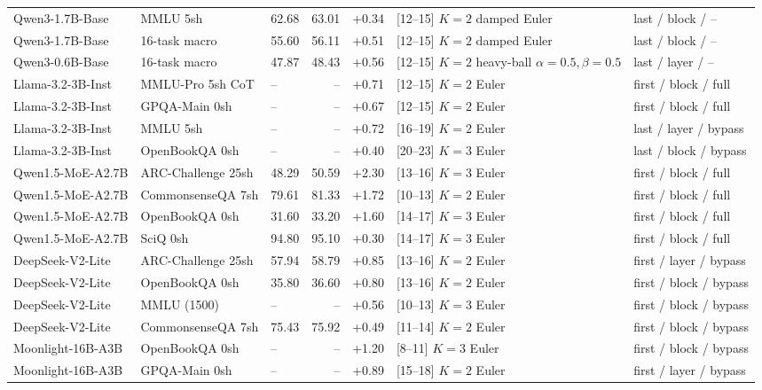 \begin{table}[h]
{\begin{tabular}{lllrrll}
Qwen3-1.7B-Base    & MMLU 5sh          & 62.68 & 63.01 & +0.34 & [12--15] $K{=}2$ damped Euler    & last  / block / -- \\
Qwen3-1.7B-Base    & 16-task macro     & 55.60 & 56.11 & +0.51 & [12--15] $K{=}2$ damped Euler    & last  / block / -- \\
Qwen3-0.6B-Base    & 16-task macro     & 47.87 & 48.43 & +0.56 & [12--15] $K{=}2$ heavy-ball $\alpha{=}0.5,\beta{=}0.5$ & last / layer / -- \\
\midrule
Llama-3.2-3B-Inst  & MMLU-Pro 5sh CoT  & --    & --    & +0.71 & [12--15] $K{=}2$ Euler  & first / block / full \\
Llama-3.2-3B-Inst  & GPQA-Main 0sh     & --    & --    & +0.67 & [12--15] $K{=}2$ Euler  & first / block / full \\
Llama-3.2-3B-Inst  & MMLU 5sh          & --    & --    & +0.72 & [16--19] $K{=}2$ Euler  & last  / layer / bypass \\
Llama-3.2-3B-Inst  & OpenBookQA 0sh    & --    & --    & +0.40 & [20--23] $K{=}3$ Euler  & last  / block / bypass \\
\midrule
Qwen1.5-MoE-A2.7B  & ARC-Challenge 25sh& 48.29 & 50.59 & +2.30 & [13--16] $K{=}3$ Euler  & first / block / full \\
Qwen1.5-MoE-A2.7B  & CommonsenseQA 7sh & 79.61 & 81.33 & +1.72 & [10--13] $K{=}2$ Euler  & first / block / full \\
Qwen1.5-MoE-A2.7B  & OpenBookQA 0sh    & 31.60 & 33.20 & +1.60 & [14--17] $K{=}3$ Euler  & first / block / full \\
Qwen1.5-MoE-A2.7B  & SciQ 0sh          & 94.80 & 95.10 & +0.30 & [14--17] $K{=}3$ Euler  & first / block / full \\
\midrule
DeepSeek-V2-Lite   & ARC-Challenge 25sh& 57.94 & 58.79 & +0.85 & [13--16] $K{=}2$ Euler  & first / layer / bypass \\
DeepSeek-V2-Lite   & OpenBookQA 0sh    & 35.80 & 36.60 & +0.80 & [13--16] $K{=}2$ Euler  & first / block / bypass \\
DeepSeek-V2-Lite   & MMLU (1500)       & --    & --    & +0.56 & [10--13] $K{=}3$ Euler  & first / block / bypass \\
DeepSeek-V2-Lite   & CommonsenseQA 7sh & 75.43 & 75.92 & +0.49 & [11--14] $K{=}2$ Euler  & first / block / bypass \\
\midrule
Moonlight-16B-A3B  & OpenBookQA 0sh    & --    & --    & +1.20 & [8--11]  $K{=}3$ Euler  & first / block / bypass \\
Moonlight-16B-A3B  & GPQA-Main 0sh     & --    & --    & +0.89 & [15--18] $K{=}2$ Euler  & first / layer / bypass \\

\end{tabular}}
\end{table}
